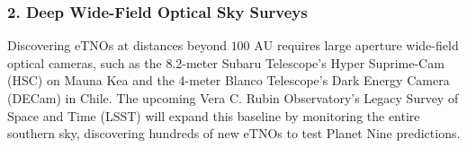 \documentclass[11pt,a4paper]{article}
\begin{document}
\subsubsection*{2. Deep Wide-Field Optical Sky Surveys}
Discovering eTNOs at distances beyond $100\text{ AU}$ requires large aperture wide-field optical cameras, such as the 8.2-meter Subaru Telescope's Hyper Suprime-Cam (HSC) on Mauna Kea and the 4-meter Blanco Telescope's Dark Energy Camera (DECam) in Chile. The upcoming Vera C. Rubin Observatory's Legacy Survey of Space and Time (LSST) will expand this baseline by monitoring the entire southern sky, discovering hundreds of new eTNOs to test Planet Nine predictions.
\end{document}
